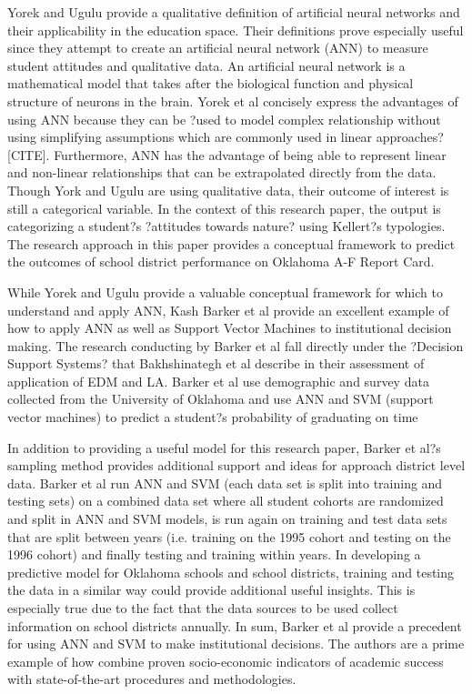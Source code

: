 \documentclass[12pt,a4paper]{article}
\begin{document}
Yorek and Ugulu provide a qualitative definition of artificial neural networks and their applicability in the education space. Their definitions prove especially useful since they attempt to create an artificial neural network (ANN) to measure student attitudes and qualitative data. An artificial neural network is a mathematical model that takes after the biological function and physical structure of neurons in the brain. Yorek et al concisely express the advantages of using ANN because they can be ?used to model complex relationship without using simplifying assumptions which are commonly used in linear approaches? [CITE]. Furthermore, ANN has the advantage of being able to represent linear and non-linear relationships that can be extrapolated directly from the data. Though York and Ugulu are using qualitative data, their outcome of interest is still a categorical variable. In the context of this research paper, the output is categorizing a student?s ?attitudes towards nature? using Kellert?s typologies. The research approach in this paper provides a conceptual framework to predict the outcomes of school district performance on Oklahoma A-F Report Card. 

While Yorek and Ugulu provide a valuable conceptual framework for which to understand and apply ANN, Kash Barker et al provide an excellent example of how to apply ANN as well as Support Vector Machines to institutional decision making. The research conducting by Barker et al fall directly under the ?Decision Support Systems? that Bakhshinategh et al describe in their assessment of application of EDM and LA. Barker et al use demographic and survey data collected from the University of Oklahoma and use ANN and SVM (support vector machines) to predict a student?s probability of graduating on time \cite{1314666}

In addition to providing a useful model for this research paper, Barker et al?s sampling method provides additional support and ideas for approach district level data. Barker et al run ANN and SVM (each data set is split into training and testing sets) on a combined data set where all student cohorts are randomized and split in ANN and SVM models, is run again on training and test data sets that are split between years (i.e. training on the 1995 cohort and testing on the 1996 cohort) and finally testing and training within years. In developing a predictive model for Oklahoma schools and school districts, training and testing the data in a similar way could provide additional useful insights. This is especially true due to the fact that the data sources to be used collect information on school districts annually. In sum, Barker et al provide a precedent for using ANN and SVM to make institutional decisions. The authors are a prime example of how combine proven socio-economic indicators of academic success with state-of-the-art procedures and methodologies.   

\newpage


\end{document}

